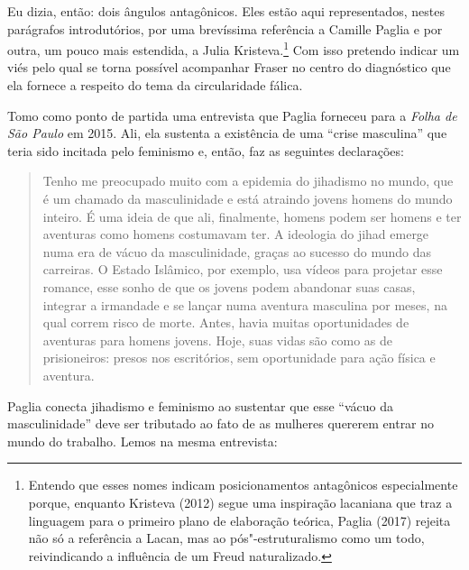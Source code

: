 Eu dizia, então: dois ângulos antagônicos. Eles estão aqui
representados, nestes parágrafos introdutórios, por uma brevíssima
referência a Camille Paglia e por outra, um pouco mais estendida, a
Julia Kristeva.\footnote{Entendo que esses nomes indicam posicionamentos
  antagônicos especialmente porque, enquanto Kristeva (2012) segue
  uma inspiração lacaniana que traz a linguagem para o primeiro plano de
  elaboração teórica, Paglia (2017) rejeita não só a referência a
  Lacan, mas ao pós"-estruturalismo como um todo, reivindicando a
  influência de um Freud naturalizado.} Com isso pretendo indicar um
viés pelo qual se torna possível acompanhar Fraser no centro do
diagnóstico que ela fornece a respeito do tema da circularidade fálica.

Tomo como ponto de partida uma entrevista que Paglia forneceu para a
\emph{Folha de São Paulo} em 2015. Ali, ela sustenta a existência de uma
``crise masculina'' que teria sido incitada pelo feminismo e, então, faz
as seguintes declarações:

\begin{quote}
Tenho me preocupado muito com a epidemia do jihadismo no mundo, que é
um chamado da masculinidade e está atraindo jovens homens do mundo
inteiro. É uma ideia de que ali, finalmente, homens podem ser homens e
ter aventuras como homens costumavam ter. A ideologia do jihad emerge
numa era de vácuo da masculinidade, graças ao sucesso do mundo das
carreiras. O Estado Islâmico, por exemplo, usa vídeos para projetar esse
romance, esse sonho de que os jovens podem abandonar suas casas,
integrar a irmandade e se lançar numa aventura masculina por meses, na
qual correm risco de morte. Antes, havia muitas oportunidades de
aventuras para homens jovens. Hoje, suas vidas são como as de
prisioneiros: presos nos escritórios, sem oportunidade para ação física
e aventura.
\end{quote}

Paglia conecta jihadismo e feminismo ao sustentar que esse ``vácuo da
masculinidade'' deve ser tributado ao fato de as mulheres quererem
entrar no mundo do trabalho. Lemos na mesma entrevista:


